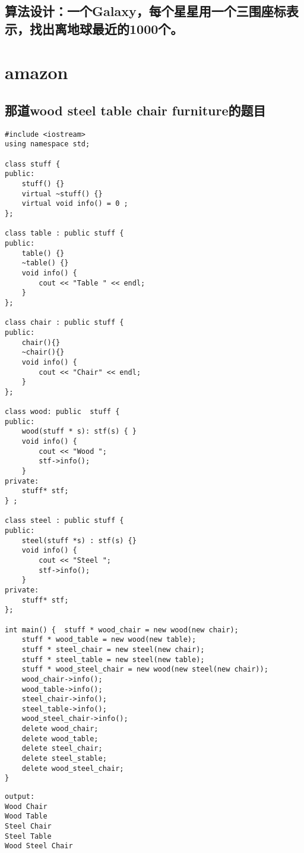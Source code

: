 \documentclass[12pt]{book}
\begin{document}
\section{算法设计：一个Galaxy，每个星星用一个三围座标表示，找出离地球最近的1000个。}
\label{sec-18-14}

\chapter{amazon}
\label{sec-19}
\section{那道wood steel table chair furniture的题目}
\label{sec-19-1}
\lstset{language=java,label= ,caption= ,numbers=none}
\begin{lstlisting}
#include <iostream>
using namespace std;

class stuff {
public:
    stuff() {}
    virtual ~stuff() {}
    virtual void info() = 0 ;
};

class table : public stuff {
public:
    table() {}
    ~table() {}
    void info() {
        cout << "Table " << endl;
    }
};

class chair : public stuff {
public:
    chair(){}
    ~chair(){}
    void info() {
        cout << "Chair" << endl;
    }
};

class wood: public  stuff {
public:
    wood(stuff * s): stf(s) { }
    void info() {
        cout << "Wood ";
        stf->info();
    }
private:
    stuff* stf;
} ;

class steel : public stuff {
public:
    steel(stuff *s) : stf(s) {}
    void info() {
        cout << "Steel ";
        stf->info();
    }
private:
    stuff* stf;
};

int main() {  stuff * wood_chair = new wood(new chair); 
    stuff * wood_table = new wood(new table); 
    stuff * steel_chair = new steel(new chair); 
    stuff * steel_table = new steel(new table); 
    stuff * wood_steel_chair = new wood(new steel(new chair)); 
    wood_chair->info(); 
    wood_table->info(); 
    steel_chair->info(); 
    steel_table->info(); 
    wood_steel_chair->info(); 
    delete wood_chair; 
    delete wood_table; 
    delete steel_chair; 
    delete steel_stable; 
    delete wood_steel_chair; 
}
\end{lstlisting}

\lstset{language=java,label= ,caption= ,numbers=none}
\begin{lstlisting}
output:
Wood Chair
Wood Table 
Steel Chair
Steel Table 
Wood Steel Chair
\end{lstlisting}
\end{document}
